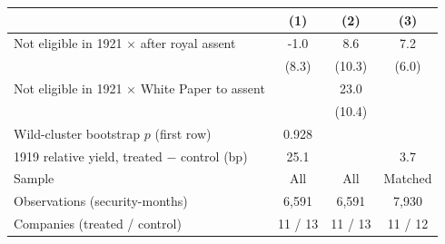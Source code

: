 \begin{tabular}{lccc}
\toprule
 & (1) & (2) & (3) \\
\midrule
Not eligible in 1921 $\times$ after royal assent & -1.0 & 8.6 & 7.2 \\
 & (8.3) & (10.3) & (6.0) \\
Not eligible in 1921 $\times$ White Paper to assent &  & 23.0 &  \\
 &  & (10.4) &  \\
Wild-cluster bootstrap $p$ (first row) & 0.928 &  &  \\
1919 relative yield, treated $-$ control (bp) & 25.1 &  & 3.7 \\
Sample & All & All & Matched \\
Observations (security-months) & 6,591 & 6,591 & 7,930 \\
Companies (treated / control) & 11 / 13 & 11 / 13 & 11 / 12 \\
\bottomrule
\end{tabular}
